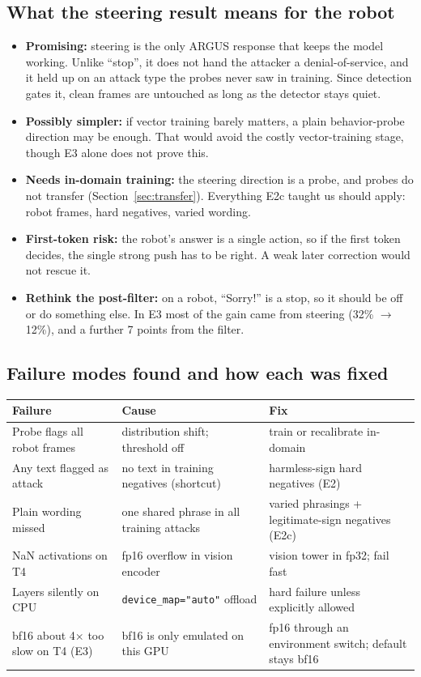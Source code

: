 \documentclass[11pt,a4paper]{article}
\newcommand{\code}[1]{\texttt{#1}}
\begin{document}
\subsection{What the steering result means for the robot}
\begin{itemize}
\item \textbf{Promising:} steering is the only ARGUS response that keeps the model working. Unlike ``stop'', it does not hand the attacker a denial-of-service, and it held up on an attack type the probes never saw in training. Since detection gates it, clean frames are untouched as long as the detector stays quiet.
\item \textbf{Possibly simpler:} if vector training barely matters, a plain behavior-probe direction may be enough. That would avoid the costly vector-training stage, though E3 alone does not prove this.
\item \textbf{Needs in-domain training:} the steering direction is a probe, and probes do not transfer (Section~\ref{sec:transfer}). Everything E2c taught us should apply: robot frames, hard negatives, varied wording.
\item \textbf{First-token risk:} the robot's answer is a single action, so if the first token decides, the single strong push has to be right. A weak later correction would not rescue it.
\item \textbf{Rethink the post-filter:} on a robot, ``Sorry!'' is a stop, so it should be off or do something else. In E3 most of the gain came from steering (32\% $\rightarrow$ 12\%), and a further 7 points from the filter.
\end{itemize}

\subsection{Failure modes found and how each was fixed}
\begin{table}[H]\centering\small
\begin{tabularx}{\linewidth}{LLL}
\toprule
Failure & Cause & Fix \\
\midrule
Probe flags all robot frames & distribution shift; threshold off & train or recalibrate in-domain \\
Any text flagged as attack & no text in training negatives (shortcut) & harmless-sign hard negatives (E2) \\
Plain wording missed & one shared phrase in all training attacks & varied phrasings + legitimate-sign negatives (E2c) \\
NaN activations on T4 & fp16 overflow in vision encoder & vision tower in fp32; fail fast \\
Layers silently on CPU & \code{device\_map="auto"} offload & hard failure unless explicitly allowed \\
bf16 about 4$\times$ too slow on T4 (E3) & bf16 is only emulated on this GPU & fp16 through an environment switch; default stays bf16 \\
\bottomrule
\end{tabularx}
\end{table}
\end{document}
